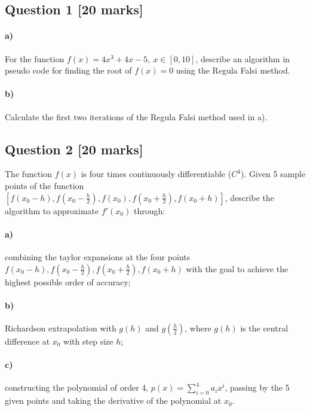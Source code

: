 \documentclass[11pt,a4paper,hidelinks,fleqn]{article}            %
\date{}
\begin{document}
\subsection*{Question 1 [20 marks]}

\paragraph{a)} For the function $f(x) = 4x^3 + 4 x - 5, ~x\in[0, 10]$,
describe an algorithm in pseudo code for finding the root of $f(x) = 0$ using the Regula Falsi method.

\paragraph{b)} Calculate the first two iterations of the Regula Falsi method used in a).

\subsection*{Question 2 [20 marks]} 

The function $f(x)$ is four times continuously differentiable ($C^4$).
Given 5 sample points of the function $[f(x_0-h), f(x_0-\frac{h}{2}), f(x_0), f(x_0+\frac{h}{2}), f(x_0+h)]$,
describe the algorithm to approximate $f'(x_0)$ through:

\paragraph{a)} combining the taylor expansions at the four points $f(x_0-h), f(x_0-\frac{h}{2}), f(x_0+\frac{h}{2}), f(x_0+h)$
with the goal to achieve the highest possible order of accuracy;

\paragraph{b)} Richardson extrapolation with $g(h)$ and $g(\frac h2)$, where $g(h)$ is the central difference at $x_0$ with step size $h$; 

\paragraph{c)} constructing the polynomial of order 4, $p(x) = \sum_{i=0}^4 a_i x^i$, passing by the 5 given points and taking the derivative of the polynomial at $x_0$.
\end{document}
